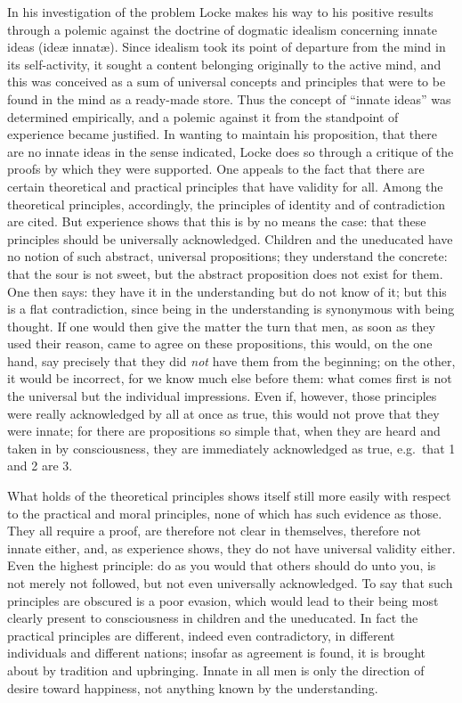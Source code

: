 In his investigation of the problem Locke makes his way to his
positive results through a polemic against the doctrine of dogmatic
idealism concerning innate ideas (ideæ innatæ). Since idealism took its
point of departure from the mind in its self-activity, it sought a
content belonging originally to the active mind, and this was conceived
as a sum of universal concepts and principles that were to be found in
the mind as a ready-made store. Thus the concept of ``innate ideas''
was determined empirically, and a polemic against it from the
standpoint of experience became justified. In wanting to maintain his
proposition, that there are no innate ideas in the sense indicated,
Locke does so through a critique of the proofs by which they were
supported. One appeals to the fact that there are certain theoretical
and practical principles that have validity for all. Among the
theoretical principles, accordingly, the principles of identity and of
contradiction are cited. But experience shows that this is by no means
the case: that these principles should be universally acknowledged.
Children and the uneducated have no notion of such abstract, universal
propositions; they understand the concrete: that the sour is not sweet,
but the abstract proposition does not exist for them. One then says:
they have it in the understanding but do not know of it; but this is a
flat contradiction, since being in the understanding is synonymous
with being thought. If one would then give the matter the turn that
men, as soon as they used their reason, came to agree on these
propositions, this would, on the one hand, say precisely that they did
\emph{not} have them from the beginning; on the other, it would be
incorrect, for we know much else before them: what comes first is not
the universal but the individual impressions.
Even if, however, those principles were really acknowledged
by all at once as true, this would not prove that they were innate; for
there are propositions so simple that, when they are heard and taken in
by consciousness, they are immediately acknowledged as true, e.g.\ that
1 and 2 are 3.

What holds of the theoretical principles shows itself still more
easily with respect to the practical and moral principles, none of
which has such evidence as those. They all require a proof, are
therefore not clear in themselves, therefore not innate either, and, as
experience shows, they do not have universal validity either. Even the
highest principle: do as you would that others should do unto you, is
not merely not followed, but not even universally acknowledged. To say
that such principles are obscured is a poor evasion, which would lead
to their being most clearly present to consciousness in children and
the uneducated. In fact the practical principles are different, indeed
even contradictory, in different individuals and different nations;
insofar as agreement is found, it is brought about by tradition and
upbringing. Innate in all men is only the direction of desire toward
happiness, not anything known by the understanding.

